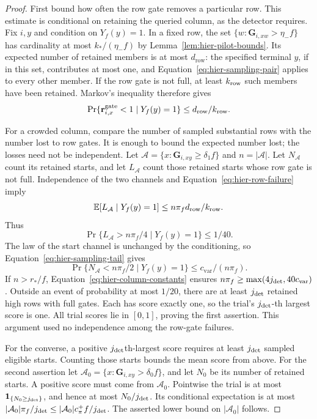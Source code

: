 \documentclass[11pt]{article}
\numberwithin{equation}{section}
\theoremstyle{definition}
\theoremstyle{remark}
\begin{document}
\begin{proof}
First bound how often the row gate removes a particular row. This estimate is conditional on retaining the queried column, as the detector requires. Fix $i,y$ and condition on $Y_f(y)=1$.  In a fixed row, the set
$\{w:{\mathbf{G}}_{i,xw}>\eta_-f\}$ has cardinality at most
$k_*/(\eta_-f)$ by Lemma~\ref{lem:hier-pilot-bounds}.
Its expected number of retained members is at most ${d}_{\mathrm{row}}$:
the specified terminal $y$, if in this set, contributes at most one,
and Equation~\eqref{eq:hier-sampling-pair} applies to every other member.
If the row gate is not full, at least ${k_{\rm row}}$ such members have been retained.
Markov's inequality therefore gives
\begin{equation}
 \Pr\{{\mathbf{r}}^{\rm gate}_{i,x}<1\mid Y_f(y)=1\}\leq {d}_{\mathrm{row}}/{k_{\rm row}}.
 \label{eq:hier-row-failure}
\end{equation}

For a crowded column, compare the number of sampled substantial rows with the number lost to row gates. It is enough to bound the expected number lost; the losses need not be independent. Let ${\mathcal{A}}=\{x:{\mathbf{G}}_{i,xy}\geq\delta_1f\}$ and $n=|{\mathcal{A}}|$.
Let $N_{\mathcal{A}}$ count its retained starts, and let $L_{\mathcal{A}}$ count those retained
starts whose row gate is not full.  Independence of the two channels
and Equation~\eqref{eq:hier-row-failure} imply
\[
 \mathbb E[L_{\mathcal{A}}\mid Y_f(y)=1]\leq n\pi_f{d}_{\mathrm{row}}/{k_{\rm row}}.
\]
Thus
\[
 \Pr\{L_{\mathcal{A}}>n\pi_f/4\mid Y_f(y)=1\}\leq1/40.
\]
The law of the start channel is unchanged by the conditioning, so
Equation~\eqref{eq:hier-sampling-tail} gives
\[
 \Pr\{N_{\mathcal{A}}<n\pi_f/2\mid Y_f(y)=1\}
       \leq {c}_{\mathrm{var}}/(n\pi_f).
\]
If $n>{r}_*/f$, Equation~\eqref{eq:hier-column-constants} ensures
$n\pi_f\geq\max(4{j_{\rm det}},40{c}_{\mathrm{var}})$.  Outside an event of probability
at most $1/20$, there are at least ${j_{\rm det}}$ retained high rows with full
gates.  Each has score exactly one, so the trial's ${j_{\rm det}}$-th largest score
is one.  All trial scores lie in $[0,1]$, proving the first assertion.
This argument used no independence among the row-gate failures.

For the converse, a positive ${j_{\rm det}}$th-largest score requires at least ${j_{\rm det}}$ sampled eligible starts. Counting those starts bounds the mean score from above. For the second assertion let
${\mathcal{A}}_0=\{x:{\mathbf{G}}_{i,xy}>\delta_0f\}$, and let $N_0$ be its number of
retained starts.  A positive score must come from ${\mathcal{A}}_0$.  Pointwise the
trial is at most $\mathbf 1_{\{N_0\geq {j_{\rm det}}\}}$, and hence at most
$N_0/{j_{\rm det}}$.  Its conditional expectation is at most
$|{\mathcal{A}}_0|\pi_f/{j_{\rm det}}\leq |{\mathcal{A}}_0|{c_\pi^+} f/{j_{\rm det}}$.  The asserted lower bound on
$|{\mathcal{A}}_0|$ follows.


\end{proof}
\end{document}
